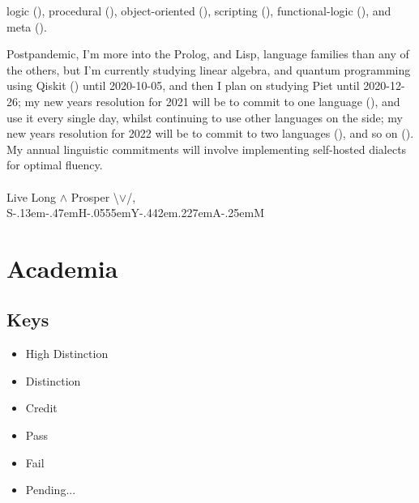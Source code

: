 \documentclass[12pt,a4paper,oneside]{article}
\def\ShYaM{\rm S\kern-.13em\lower-.47em\hbox{\fontsize{.5em}{0em}\selectfont H}\kern-.0555em{}Y\kern-.442em\lower.227em\hbox{A}\kern-.25em{}M}
\newcommand{\sh}[1]{{\color{gray}{#1}}}
\newcommand{\uniHD}[1]{\colorbox{blue!25}{#1}}
\newcommand{\uniD}[1]{\colorbox{green!25}{#1}}
\newcommand{\uniC}[1]{\colorbox{yellow!25}{#1}}
\newcommand{\uniP}[1]{\colorbox{orange!25}{#1}}
\newcommand{\uniF}[1]{\colorbox{red!25}{#1}}
\newcommand{\uniU}[1]{\colorbox{gray!25}{#1}}
\begin{document}
logic (\sh{Prolog}),
procedural (\sh{assembly}),
object-oriented (\sh{Smalltalk \& C++; gcc \=c cpp supports inline assembly \=c portability}),
scripting (\sh{Perl}),
functional-logic (\sh{Curry \& Mercury}),
and
meta (\sh{Lisp \& ML}).
\par{}Postpandemic, I'm more into the Prolog, and Lisp, language families than any of the others, but I'm currently studying linear algebra, and quantum programming using Qiskit (\sh{Python}) until 2020-10-05, and then I plan on studying Piet until 2020-12-26; my new years resolution for 2021 will be to commit to one language (\sh{probably Lisp, even though Prolog is better}), and use it every single day, whilst continuing to use other languages on the side; my new years resolution for 2022 will be to commit to two languages (\sh{probably Prolog}), and so on (\sh{Smalltalk is probably next, but Haskell, or Perl, could take its' place}). My annual linguistic commitments will involve implementing self-hosted dialects for optimal fluency.
\\\medskip{}\\Live Long $\land$ Prosper \textbackslash$\lor$/,
\\\ShYaM

\newpage
\section{Academia}

\setcounter{subsection}{-1}
\subsection{Keys}
\begin{multicols}{3}
\begin{itemize}
    \item \uniHD{High Distinction}
    \item \uniD{Distinction}
    \item \uniC{Credit}
    \item \uniP{Pass}
    \item \uniF{Fail}
    \item \uniU{Pending...}
\end{itemize}
\end{multicols}
\addtocounter{subsection}{1}
{}
\addtocounter{subsection}{-1}
\end{document}

